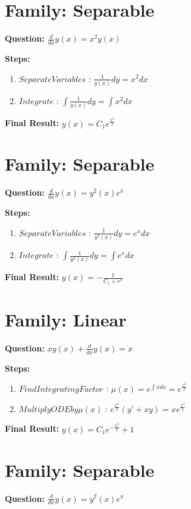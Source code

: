 \documentclass{article}
\begin{document}
\section*{Family: Separable}
\textbf{Question:} $\frac{d}{d x} y{\left(x \right)} = x^{2} y{\left(x \right)}$

\textbf{Steps:}
\begin{enumerate}
\item $Separate Variables$ :  $\frac{1}{y{\left(x \right)}} dy = x^{2} dx$
\item $Integrate$ :  $\int \frac{1}{y{\left(x \right)}} dy = \int x^{2} dx$
\end{enumerate}
\textbf{Final Result:} $y{\left(x \right)} = C_{1} e^{\frac{x^{3}}{3}}$

\section*{Family: Separable}
\textbf{Question:} $\frac{d}{d x} y{\left(x \right)} = y^{2}{\left(x \right)} e^{x}$

\textbf{Steps:}
\begin{enumerate}
\item $Separate Variables$ :  $\frac{1}{y^{2}{\left(x \right)}} dy = e^{x} dx$
\item $Integrate$ :  $\int \frac{1}{y^{2}{\left(x \right)}} dy = \int e^{x} dx$
\end{enumerate}
\textbf{Final Result:} $y{\left(x \right)} = - \frac{1}{C_{1} + e^{x}}$

\section*{Family: Linear}
\textbf{Question:} $x y{\left(x \right)} + \frac{d}{d x} y{\left(x \right)} = x$

\textbf{Steps:}
\begin{enumerate}
\item $Find Integrating Factor$ :  $\mu(x) = e^{\int x dx} = e^{\frac{x^{2}}{2}}$
\item $Multiply ODE by \mu(x)$ :  $e^{\frac{x^{2}}{2}}(y' + xy) = x e^{\frac{x^{2}}{2}}$
\end{enumerate}
\textbf{Final Result:} $y{\left(x \right)} = C_{1} e^{- \frac{x^{2}}{2}} + 1$

\section*{Family: Separable}
\textbf{Question:} $\frac{d}{d x} y{\left(x \right)} = y^{2}{\left(x \right)} e^{x}$
\end{document}
